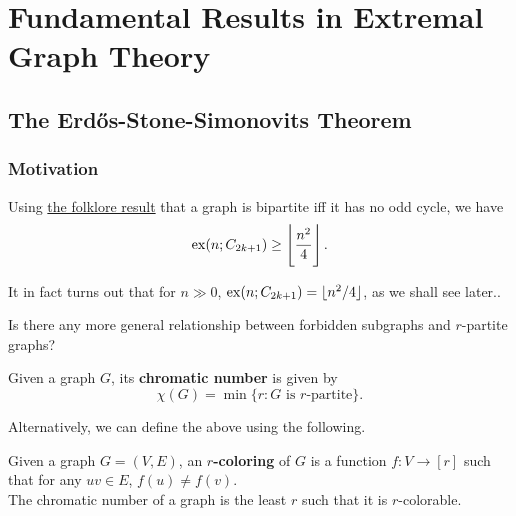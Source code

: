 \section{Fundamental Results in Extremal Graph Theory}


	\subsection{The Erd\H{o}s-Stone-Simonovits Theorem}

		\subsubsection{Motivation}

			Using \href{https://proofwiki.org/wiki/Graph_is_Bipartite_iff_No_Odd_Cycles}{the folklore result} that a graph is bipartite iff it has no odd cycle, we have
			\[ \operatorname{ex}(n;C_{2k+1}) \ge \left\lfloor \frac{n^2}{4} \right\rfloor. \]
			\begin{remark}
				It in fact turns out that for $n\gg 0$, $\operatorname{ex}(n;C_{2k+1}) = \lfloor n^2/4 \rfloor$, as we shall see later..
			\end{remark}

			Is there any more general relationship between forbidden subgraphs and $r$-partite graphs?

			\begin{fdef}
				\label{def: chromatic number}
				Given a graph $G$, its \textbf{chromatic number} is given by
				\[ \chi(G) = \min\{r : G\text{ is $r$-partite}\}. \]
			\end{fdef}

			Alternatively, we can define the above using the following.

			\begin{fdef}
				\label{def: r-coloring}
				Given a graph $G=(V,E)$, an \textbf{$r$-coloring} of $G$ is a function $f : V \to [r]$ such that for any $uv\in E$, $f(u) \ne f(v)$.\\
				The chromatic number of a graph is the least $r$ such that it is $r$-colorable.
			\end{fdef}

